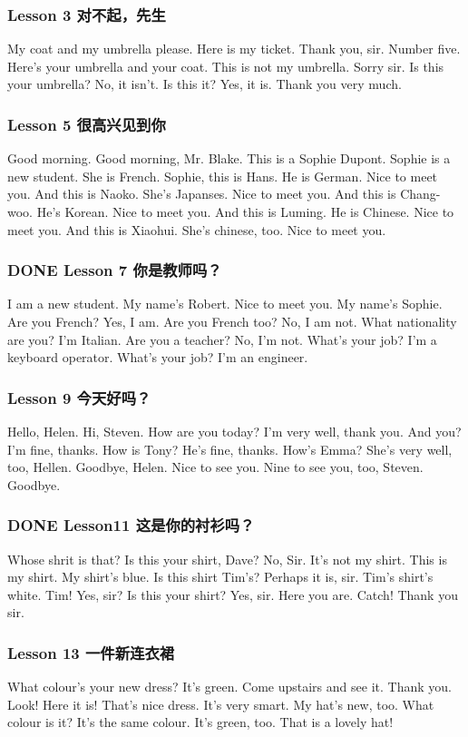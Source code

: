 \documentclass[11pt]{ctexart}
\begin{document}
\subsubsection{Lesson 3 对不起，先生}
\label{sec:orgb1f3197}
My coat and my umbrella please.
Here is my ticket.
Thank you, sir.
Number five.
Here's your umbrella and your coat.
This is not my umbrella.
Sorry sir.
Is this your umbrella?
No, it isn't.
Is this it?
Yes, it is.
Thank you very much.
\subsubsection{Lesson 5 很高兴见到你}
\label{sec:orgb4e7863}
Good morning.
Good morning, Mr. Blake.
This is a Sophie Dupont.
Sophie is a new student.
She is French.
Sophie, this is Hans.
He is German.
Nice to meet you.
And this is Naoko.
She's Japanses.
Nice to meet you.
And this is Chang-woo.
He's Korean.
Nice to meet you.
And this is Luming.
He is Chinese.
Nice to meet you.
And this is Xiaohui.
She's chinese, too.
Nice to meet you.
\subsubsection{{\bfseries\sffamily DONE} Lesson 7 你是教师吗？}
\label{sec:org7f25d48}
I am a new student.
My name's Robert.
Nice to meet you.
My name's Sophie.
Are you French?
Yes, I am.
Are you French too?
No, I am not.
What nationality are you?
I'm Italian.
Are you a teacher?
No, I'm not.
What's your job?
I'm a keyboard operator.
What's your job?
I'm an engineer.
\subsubsection{Lesson 9 今天好吗？}
\label{sec:orgc6f5a15}
Hello, Helen.
Hi, Steven.
How are you today?
I'm very well, thank you.
And you?
I'm fine, thanks.
How is Tony?
He's fine, thanks.
How's Emma?
She's very well, too, Hellen.
Goodbye, Helen.
Nice to see you.
Nine to see you, too, Steven.
Goodbye.
\subsubsection{{\bfseries\sffamily DONE} Lesson11 这是你的衬衫吗？}
\label{sec:orgf8c72e4}
Whose shrit is that?
Is this your shirt, Dave?
No, Sir.
It's not my shirt.
This is my shirt.
My shirt's blue.
Is this shirt Tim's?
Perhaps it is, sir.
Tim's shirt's white.
Tim!
Yes, sir?
Is this your shirt?
Yes, sir.
Here you are.
Catch!
Thank you sir.
\subsubsection{Lesson 13 一件新连衣裙}
\label{sec:org333baa6}
What colour's your new dress?
It's green.
Come upstairs and see it.
Thank you.
Look! Here it is!
That's nice dress.
It's very smart.
My hat's new, too.
What colour is it?
It's the same colour.
It's green, too.
That is a lovely hat!
\end{document}
